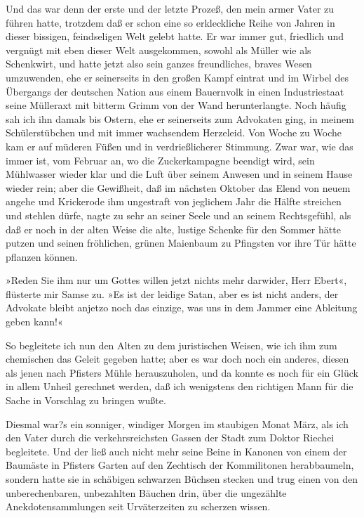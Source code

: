 Und das war denn der erste und der letzte Prozeß, den mein armer
Vater zu führen hatte, trotzdem daß er schon eine so erkleckliche
Reihe von Jahren in dieser bissigen, feindseligen Welt gelebt
hatte. Er war immer gut, friedlich und vergnügt mit eben dieser
Welt ausgekommen, sowohl als Müller wie als Schenkwirt, und hatte
jetzt also sein ganzes freundliches, braves Wesen umzuwenden, ehe
er seinerseits in den großen Kampf eintrat und im Wirbel des
Übergangs der deutschen Nation aus einem Bauernvolk in einen
Industriestaat seine Mülleraxt mit bitterm Grimm von der Wand
herunterlangte. Noch häufig sah ich ihn damals bis Ostern, ehe er
seinerseits zum Advokaten ging, in meinem Schülerstübchen und mit
immer wachsendem Herzeleid. Von Woche zu Woche kam er auf müderen
Füßen und in verdrießlicherer Stimmung. Zwar war, wie das immer
ist, vom Februar an, wo die Zuckerkampagne beendigt wird, sein
Mühlwasser wieder klar und die Luft über seinem Anwesen und in
seinem Hause wieder rein; aber die Gewißheit, daß im nächsten
Oktober das Elend von neuem angehe und Krickerode ihm ungestraft
von jeglichem Jahr die Hälfte streichen und stehlen dürfe, nagte zu
sehr an seiner Seele und an seinem Rechtsgefühl, als daß er noch in
der alten Weise die alte, lustige Schenke für den Sommer hätte
putzen und seinen fröhlichen, grünen Maienbaum zu Pfingsten vor
ihre Tür hätte pflanzen können.

»Reden Sie ihm nur um Gottes willen jetzt nichts mehr darwider,
Herr Ebert«, flüsterte mir Samse zu. »Es ist der leidige Satan,
aber es ist nicht anders, der Advokate bleibt anjetzo noch das
einzige, was uns in dem Jammer eine Ableitung geben kann!«

So begleitete ich nun den Alten zu dem juristischen Weisen, wie ich
ihm zum chemischen das Geleit gegeben hatte; aber es war doch noch
ein anderes, diesen als jenen nach Pfisters Mühle herauszuholen,
und da konnte es noch für ein Glück in allem Unheil gerechnet
werden, daß ich wenigstens den richtigen Mann für die Sache in
Vorschlag zu bringen wußte.

Diesmal war?s ein sonniger, windiger Morgen im staubigen Monat
März, als ich den Vater durch die verkehrsreichsten Gassen der
Stadt zum Doktor Riechei begleitete. Und der ließ auch nicht mehr
seine Beine in Kanonen von einem der Baumäste in Pfisters Garten
auf den Zechtisch der Kommilitonen herabbaumeln, sondern hatte sie
in schäbigen schwarzen Büchsen stecken und trug einen von den
unberechenbaren, unbezahlten Bäuchen drin, über die ungezählte
Anekdotensammlungen seit Urväterzeiten zu scherzen wissen.

